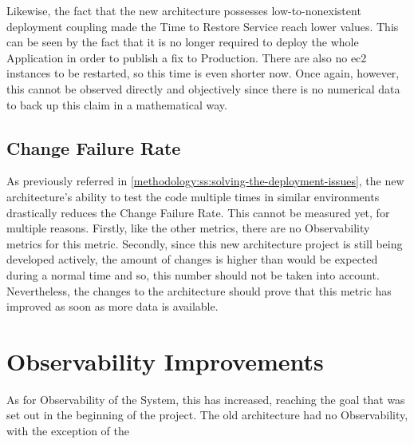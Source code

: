 Likewise, the fact that the new architecture possesses low-to-nonexistent deployment coupling made the Time to Restore Service reach lower values. This can be seen by the fact that it is no longer required to deploy the whole Application in order to publish a fix to Production. There are also no \gls{ec2} instances to be restarted, so this time is even shorter now. Once again, however, this cannot be observed directly and objectively since there is no numerical data to back up this claim in a mathematical way.

\subsection{Change Failure Rate}\label{results-and-discussion:ss:change-failure-rate}

As previously referred in \cref{methodology:ss:solving-the-deployment-issues}, the new architecture's ability to test the code multiple times in similar environments drastically reduces the Change Failure Rate. This cannot be measured yet, for multiple reasons. Firstly, like the other metrics, there are no Observability metrics for this metric. Secondly, since this new architecture project is still being developed actively, the amount of changes is higher than would be expected during a normal time and so, this number should not be taken into account.
Nevertheless, the changes to the architecture should prove that this metric has improved as soon as more data is available.


\section{Observability Improvements}\label{results-and-discussion:ss:observability-improvements}

As for Observability of the System, this has increased, reaching the goal that was set out in the beginning of the project.
The old architecture had no Observability, with the exception of the 

